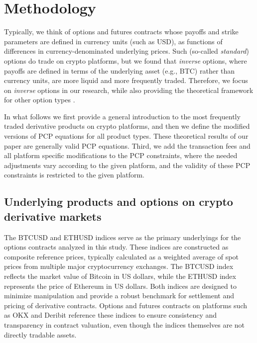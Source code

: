 \documentclass[12pt]{article}
\begin{document}
\begin{table}[!htbp]
\centering
{\renewcommand{\arraystretch}{1.3}\normalfont\normalsize}
\caption{Summary statistics of put-call pairs: number of contracts and liquidity measures.}
\label{fig:summary_df}
\end{table}


\section{Methodology}

Typically, we think of options and futures contracts whose payoffs and strike parameters are defined in currency units (such as USD), as functions of differences in currency-denominated underlying prices. Such (so-called \textit{standard}) options do trade on crypto platforms, but we found that \textit{inverse} options, where payoffs are defined in terms of the underlying asset (e.g., BTC) rather than currency units, are more liquid and more frequently traded. Therefore, we focus on \textit{inverse} options in our research, while also providing the theoretical framework for other option types \citep{alexander2023crypto, bouchouev1997inverse, lucic2024valuation}.

In what follows we first provide a general introduction to the most frequently traded derivative products on crypto platforms, and then we define the modified versions of PCP equations for all product types. These theoretical results of our paper are generally valid PCP equations. Third, we add the transaction fees and all platform specific modifications to the PCP constraints, where the needed adjustments vary according to the given platform, and the validity of these PCP constraints is restricted to the given platform.

\subsection{Underlying products and options on crypto derivative markets}

The BTCUSD and ETHUSD indices serve as the primary underlyings for the options contracts analyzed in this study. These indices are constructed as composite reference prices, typically calculated as a weighted average of spot prices from multiple major cryptocurrency exchanges. The BTCUSD index reflects the market value of Bitcoin in US dollars, while the ETHUSD index represents the price of Ethereum in US dollars. Both indices are designed to minimize manipulation and provide a robust benchmark for settlement and pricing of derivative contracts. Options and futures contracts on platforms such as OKX and Deribit reference these indices to ensure consistency and transparency in contract valuation, even though the indices themselves are not directly tradable assets.
\end{document}
